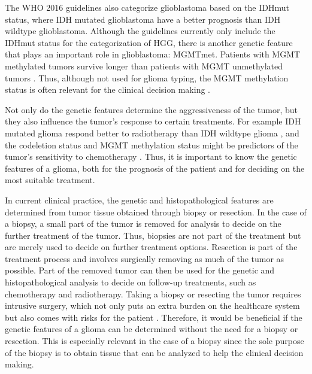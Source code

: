 The \gls{WHO} 2016 guidelines also categorize \gls{glioblastoma} based on the \gls{IDHmut} status, where \gls{IDH} mutated \gls{glioblastoma} have a better prognosis than \gls{IDH} wildtype \gls{glioblastoma}.
Although the guidelines currently only include the \gls{IDHmut} status for the categorization of \gls{HGG}, there is another genetic feature that plays an important role in \gls{glioblastoma}: \gls{MGMTmet}.
Patients with \gls{MGMT} methylated \glspl{tumor} survive longer than patients with \gls{MGMT} unmethylated \glspl{tumor} \autocite{martinez2007MGMT, gessler2018MGMT, weller2009molecularGBM}.
Thus, although not used for \gls{glioma} typing, the \gls{MGMT} methylation status is often relevant for the clinical decision making \autocite{molinaro2019geneticepidemiology}.

Not only do the genetic features determine the aggressiveness of the \gls{tumor}, but they also influence the \gls{tumor}'s response to certain treatments.
For example \gls{IDH} mutated \gls{glioma} respond better to radiotherapy than \gls{IDH} wildtype \gls{glioma} \autocite{juratli2015IDHtreatment}, and the \gls{codeletion} status and \gls{MGMT} methylation status might be predictors of the \gls{tumor}'s sensitivity to chemotherapy \autocite{idbaih2007markersresponse}.
Thus, it is important to know the genetic features of a \gls{glioma}, both for the prognosis of the patient and for deciding on the most suitable treatment.

In current clinical practice, the genetic and histopathological features are determined from \gls{tumor} tissue obtained through biopsy or resection.
In the case of a biopsy, a small part of the \gls{tumor} is removed for analysis to decide on the further treatment of the \gls{tumor}.
Thus, biopsies are not part of the treatment but are merely used to decide on further treatment options.
Resection is part of the treatment process and involves surgically removing as much of the \gls{tumor} as possible.
Part of the removed \gls{tumor} can then be used for the genetic and histopathological analysis to decide on follow-up treatments, such as chemotherapy and radiotherapy.
Taking a biopsy or resecting the \gls{tumor} requires intrusive surgery, which not only puts an extra burden on the healthcare system but also comes with risks for the patient \autocite{chen2009biopsy}.
Therefore, it would be beneficial if the genetic features of a \gls{glioma} can be determined without the need for a biopsy or resection.
This is especially relevant in the case of a biopsy since the sole purpose of the biopsy is to obtain tissue that can be analyzed to help the clinical decision making.

